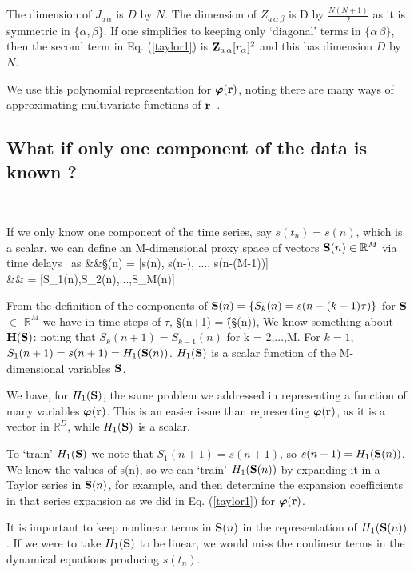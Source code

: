 \documentclass[12pt]{article}
\begin{document}
The dimension of $J_{a\,\alpha}$ is $D$ by $N$. The dimension of $Z_{a\,\alpha\,\beta}$ is D by $\frac{N(N+1)}{2}$ as it is symmetric in $\{\alpha,\beta\}$. If one simplifies to keeping only `diagonal' terms in $\{\alpha\,\beta\}$, then the second term in Eq. (\ref{taylor1}) 
is $\Z_{a\,\alpha} [r_{\alpha}]^2$ and this has dimension $D$ by $N$.

We use this polynomial representation for $\bvarphi(\r)$, noting there are many ways of approximating multivariate functions of $\r$~\cite{silverman86,buhmann09,casdagli89,billings13,broom88,Scott05}.

\subsection{What if only one component of the data is known ?}~\label{tdelay}


If we only know one component of the time series, say $s(t_n) = s(n)$, which is a scalar, we can define an M-dimensional proxy space of vectors $\S(n) \in {\mathbb R}^M$ via time delays~\cite{takens81,abar96,kantz04} as
\bea
&&\S(n) = [s(n), s(n-\tau), ..., s(n-(M-1)\tau)]  \nonumber \\
&& = [S_1(n),S_2(n),...,S_M(n)] 
\label{timedelay1}
\eea

From the definition of the components of $\S(n) = \{S_k(n) = s(n - (k-1)\tau)\}$ 
for $\S$ $\in$ ${\mathbb R}^{M}$ we have in time steps of $\tau$,
\be
\S(n+1) = \H(\S(n)),
\ee
We know something about $\H(\S)$: noting that $S_k(n+1) = S_{k-1}(n)$ for k = 2,...,M. For $k = 1$,  $S_1(n+1) = s(n+1) =  H_1(\S(n))$. $H_1(\S)$ is a scalar function of the M-dimensional variables $\S$.

We have, for $H_1(\S)$, the same problem we addressed in representing a function of many variables $\bvarphi(\r)$. This is an easier issue than representing $\bvarphi(\r)$, as it is a vector in 
$\mathbb{R}^{D}$, while  $H_1(\S)$ is a scalar.

To `train' $H_1(\S)$ we note that $S_1(n+1) = s(n+1)$, so $s(n+1) = H_1(\S(n))$. 
We know the values of s(n), so we can `train' $H_1(\S(n))$ by expanding it in a Taylor series in $\S(n)$, for example, and then determine the expansion coefficients in that series expansion as we did in Eq. (\ref{taylor1}) for $\bvarphi(\r)$. 

It is important to keep nonlinear terms in $\S(n)$ in the representation of $H_1(\S(n))$. %
If we were to take $H_1(\S)$ to be linear, we would miss the nonlinear terms in the dynamical equations producing $s(t_n)$.
\end{document}
